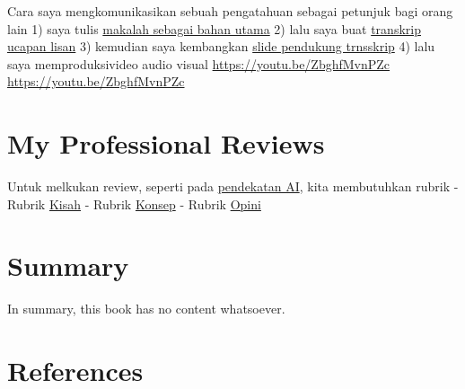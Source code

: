 \documentclass[
  letterpaper,
  DIV=11,
  numbers=noendperiod]{scrreprt}
\begin{document}
Cara saya mengkomunikasikan sebuah pengatahuan sebagai petunjuk bagi
orang lain 1) saya tulis
\href{Rekomendasi\%20Presentasi\%20Efektif(Contoh\%20Makalah).pdf}{makalah
sebagai bahan utama} 2) lalu saya buat
\href{Contoh\%20Transkrip\%20Presentasi.pdf}{transkrip ucapan lisan} 3)
kemudian saya kembangkan
\href{Rekomendasi\%20Presentasi\%20(Contoh\%20Slides).pdf}{slide
pendukung trnsskrip} 4) lalu saya memproduksivideo audio visual
\url{https://youtu.be/ZbghfMvnPZc} \url{https://youtu.be/ZbghfMvnPZc}


\chapter{My Professional Reviews}\label{my-professional-reviews}

Untuk melkukan review, seperti pada
\href{../My_Personal_Reviews/Doc.5.Mengevaluasi-Esai-Berdasarkan-Rubrik.pdf}{pendekatan
AI}, kita membutuhkan rubrik - Rubrik
\href{Dok.4.a.Rubrik_Kisah.pdf}{Kisah} - Rubrik
\href{Dok.4.b.Rubrik_Konsep.pdf}{Konsep} - Rubrik
\href{Dok.4.c.Rubrik_Opini.pdf}{Opini}


\chapter{Summary}\label{summary}

In summary, this book has no content whatsoever.


\chapter*{References}\label{references}


\label{refs}
\end{document}

